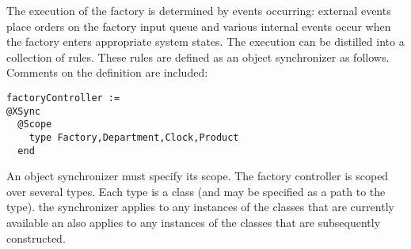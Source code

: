 \documentclass{article}
\begin{document}
The execution of the factory is determined by events occurring: external events place orders
on the factory input queue and various internal events occur when the factory enters appropriate 
system states. The execution can be distilled into a collection of rules. These rules are
defined as an object synchronizer as follows. Comments on the definition are included:
\begin{verbatim}
factoryController := 
@XSync
  @Scope 
    type Factory,Department,Clock,Product
  end
\end{verbatim}
An object synchronizer must specify its scope. The factory controller is scoped over
several types. Each type is a class (and may be specified as a path to the type).
the synchronizer applies to any instances of the classes that are currently available
an also applies to any instances of the classes that are subsequently constructed.
\end{document}
